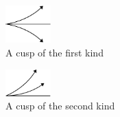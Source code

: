 \documentclass[11pt]{amsbook}
\begin{document}
\begin{exmp}
{\begin{multicols}{3}
			\begin{center}
				\includegraphics[width=0.13\textwidth, keepaspectratio]{images/b2p2-318-fig04}\\
				\vspace*{\fill}
				A cusp of the first kind
			\end{center}

			\begin{center}
				\includegraphics[width=0.13\textwidth, keepaspectratio]{images/b2p2-318-fig05}\\
				\vspace*{\fill}
				A cusp of the second kind
			\end{center}
		\end{multicols}}
\end{exmp}
\end{document}
